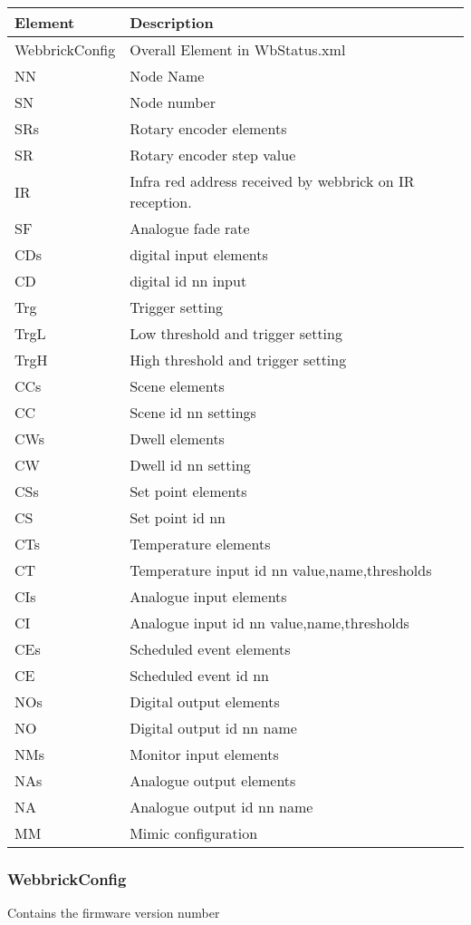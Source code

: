     \begin{tabular}{l|l}
    Element&Description\\
    \hline
    WebbrickConfig&Overall Element in WbStatus.xml\\
    NN&Node Name\\
    SN&Node number\\
    SRs&Rotary encoder elements\\
    SR&Rotary encoder step value\\
    IR&Infra red address received by webbrick on IR reception.\\
    SF&Analogue fade rate\\
    CDs&digital input elements\\
    CD&digital id nn input\\
    Trg&Trigger setting\\
    TrgL&Low threshold and trigger setting\\
    TrgH&High threshold and trigger setting\\
    CCs&Scene elements\\
    CC&Scene id nn settings\\
    CWs&Dwell elements\\
    CW&Dwell id nn setting\\
    CSs&Set point elements\\
    CS&Set point id nn \\
    CTs&Temperature elements\\
    CT&Temperature input id nn value,name,thresholds\\
    CIs&Analogue input elements\\
    CI&Analogue input id nn value,name,thresholds\\
    CEs&Scheduled event elements\\
    CE&Scheduled event id nn \\
    NOs&Digital output elements\\
    NO&Digital output id nn name \\
    NMs&Monitor input elements\\
    NAs&Analogue output elements\\
    NA&Analogue output id nn name \\
    MM&Mimic configuration\\
    \end{tabular}

\subsubsection {WebbrickConfig}
Contains the firmware version number

